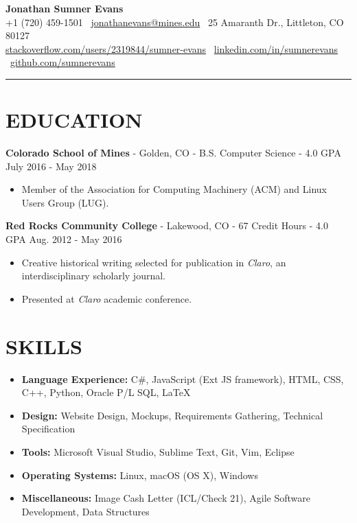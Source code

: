 \documentclass[10.5pt,letterpaper]{article}
\begin{document}
\begin{center}
    \huge\textbf{Jonathan Sumner Evans}\\
    \vspace{3pt}
    \small +1 (720) 459-1501
    \textbar\ \href{mailto:jonathanevans@mines.edu}{jonathanevans@mines.edu}
    \textbar\ 25 Amaranth Dr., Littleton, CO 80127 \\
    \href{http://stackoverflow.com/users/2319844/sumner-evans}{stackoverflow.com/users/2319844/sumner-evans}
    \textbar\ \href{https://www.linkedin.com/in/sumnerevans}{linkedin.com/in/sumnerevans}
    \textbar\ \href{https://github.com/sumnerevans}{github.com/sumnerevans}
    \rule{\textwidth}{0.5pt}
\end{center}

\section*{EDUCATION}
\textbf{Colorado School of Mines} - Golden, CO - B.S. Computer Science - 4.0 GPA \hfill
July 2016 - May 2018
\begin{itemize}
    \item Member of the Association for Computing Machinery (ACM) and Linux Users Group (LUG).
\end{itemize}

\vspace{4pt}
\textbf{Red Rocks Community College} - Lakewood, CO - 67 Credit Hours - 4.0 GPA \hfill
Aug. 2012 - May 2016
\begin{itemize}
    \item Creative historical writing selected for publication in \textit{Claro}, an
        interdisciplinary scholarly journal.
    \item Presented at \textit{Claro} academic conference.
\end{itemize}

\section*{SKILLS}
{
    \renewcommand\labelitemi{}
    \renewcommand\leftmargini{0pt}
    \begin{itemize}
        \item \textbf{Language Experience:} C\#, JavaScript (Ext JS framework), HTML, CSS, C++,
            Python, Oracle P/L SQL, \LaTeX
        \item \textbf{Design:} Website Design, Mockups, Requirements Gathering, Technical
            Specification
        \item \textbf{Tools:} Microsoft Visual Studio, Sublime Text, Git, Vim, Eclipse
        \item \textbf{Operating Systems:} Linux, macOS (OS X), Windows
        \item \textbf{Miscellaneous:} Image Cash Letter (ICL/Check 21), Agile Software Development,
            Data Structures
    \end{itemize}
}
\end{document}
